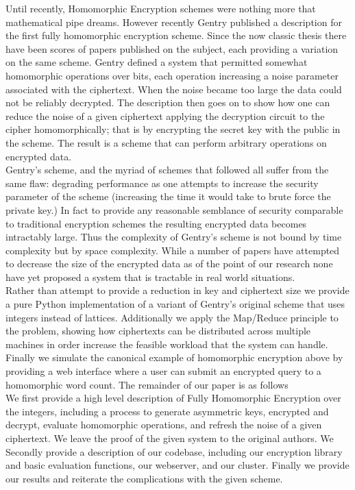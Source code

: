 \documentclass[letterpaper,11pt]{article} %
\begin{document}
	Until recently, Homomorphic Encryption schemes were nothing more that mathematical pipe dreams. However recently Gentry published a description for the first fully homomorphic encryption scheme. Since the now classic thesis there have been scores of papers published on the subject, each providing a variation on the same scheme. Gentry defined a system that permitted somewhat homomorphic operations over bits, each operation increasing a noise parameter associated with the ciphertext. When the noise became too large the data could not be reliably decrypted. The description then goes on to show how one can reduce the noise of a given ciphertext applying the decryption circuit to the cipher homomorphically; that is by encrypting the secret key with the public in the scheme. The result is a scheme that can perform arbitrary operations on encrypted data.\\

	Gentry's scheme, and the myriad of schemes that followed all suffer from the same flaw: degrading performance as one attempts to increase the security parameter of the scheme (increasing the time it would take to brute force the private key.) In fact to provide any reasonable semblance of security comparable to traditional encryption schemes the resulting encrypted data becomes intractably large. Thus the complexity of Gentry's scheme is not bound by time complexity but by space complexity. While a number of papers have attempted to decrease the size of the encrypted data as of the point of our research none have yet proposed a system that is tractable in real world situations.\\

	Rather than attempt to provide a reduction in key and ciphertext size we provide a pure Python implementation of a variant of Gentry's original scheme that uses integers instead of lattices. Additionally we apply the Map/Reduce principle to the problem, showing how ciphertexts can be distributed across multiple machines in order increase the feasible workload that the system can handle. Finally we simulate the canonical example of homomorphic encryption above by providing a web interface where a user can submit an encrypted query to a homomorphic word count. The remainder of our paper is as follows\\

	We first provide a high level description of Fully Homomorphic Encryption over the integers, including a process to generate asymmetric keys, encrypted and decrypt, evaluate homomorphic operations, and refresh the noise of a given ciphertext. We leave the proof of the given system to the original authors. We Secondly provide a description of our codebase, including our encryption library and basic evaluation functions, our webserver, and our cluster. Finally we provide our results and reiterate the complications with the given scheme.
\end{document}
